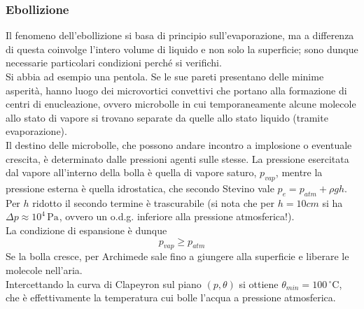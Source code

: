 \documentclass[10pt, oneside]{book}
\newcommand{\celsius}{\, \mathrm{{}^\circ C}}
\newcommand{\pascal}[1]{\, \mathrm{Pa^{#1}}}
\newcommand{\ds}{\displaystyle}
\begin{document}
\subsubsection{Ebollizione}
Il fenomeno dell'ebollizione si basa di principio sull'evaporazione, ma a differenza di questa coinvolge l'intero volume di liquido e non solo la superficie; sono dunque necessarie particolari condizioni perché si verifichi.
\\Si abbia ad esempio una pentola. Se le sue pareti presentano delle minime asperità, hanno luogo dei microvortici convettivi che portano alla formazione di centri di enucleazione, ovvero microbolle in cui temporaneamente alcune molecole allo stato di vapore si trovano separate da quelle allo stato liquido (tramite evaporazione).
\\Il destino delle microbolle, che possono andare incontro a implosione o eventuale crescita, è determinato dalle pressioni agenti sulle stesse. La pressione esercitata dal vapore all'interno della bolla è quella di vapore saturo, $p_{vap}$, mentre la pressione esterna è quella idrostatica, che secondo Stevino vale $\ds p_e = p_{atm} + \rho g h$.\\
Per $h$ ridotto il secondo termine è trascurabile (si nota che per $h = 10cm$ si ha $\Delta p \approx 10^4 \pascal{}$, ovvero un o.d.g. inferiore alla pressione atmosferica!).\\La condizione di espansione è dunque 
\[p_{vap} \geq p_{atm}\]
Se la bolla cresce, per Archimede sale fino a giungere alla superficie e liberare le molecole nell'aria.
\\Intercettando la curva di Clapeyron sul piano $(p,\theta)$ si ottiene $\theta_{min} = 100 \celsius$, che è effettivamente la temperatura cui bolle l'acqua a pressione atmosferica.
\end{document}
